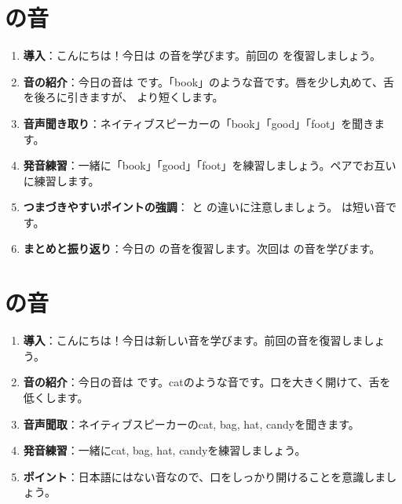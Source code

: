 \documentclass[book,jafontscale=0.9247]{jlreq}
\begin{document}
\section{ の音}
\begin{enumerate}
    \item \textbf{導入}：こんにちは！今日は  の音を学びます。前回の  を復習しましょう。
    \item \textbf{音の紹介}：今日の音は  です。「book」のような音です。唇を少し丸めて、舌を後ろに引きますが、 より短くします。
    \item \textbf{音声聞き取り}：ネイティブスピーカーの「book」「good」「foot」を聞きます。
    \item \textbf{発音練習}：一緒に「book」「good」「foot」を練習しましょう。ペアでお互いに練習します。
    \item \textbf{つまづきやすいポイントの強調}： と  の違いに注意しましょう。  は短い音です。
    \item \textbf{まとめと振り返り}：今日の  の音を復習します。次回は  の音を学びます。
\end{enumerate}



\section{ の音}
\begin{enumerate}
    \item \textbf{導入}：こんにちは！今日は新しい音を学びます。前回の音を復習しましょう。
    \item \textbf{音の紹介}：今日の音は  です。catのような音です。口を大きく開けて、舌を低くします。
    \item \textbf{音声聞取}：ネイティブスピーカーのcat, bag, hat, candyを聞きます。
    \item \textbf{発音練習}：一緒にcat, bag, hat, candyを練習しましょう。
    \item \textbf{ポイント}：日本語にはない音なので、口をしっかり開けることを意識しましょう。
 \end{enumerate}
\end{document}
